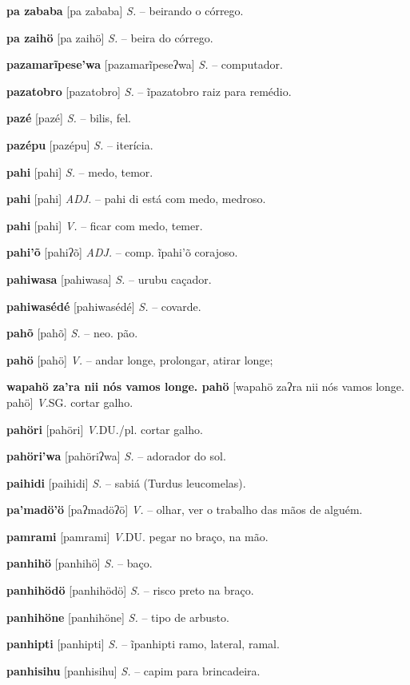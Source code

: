 \textbf{pa zababa} [pa zababa] \textit{S.} -- beirando o córrego.

\textbf{pa zaihö} [pa zaihö] \textit{S.} -- beira do córrego.

\textbf{pazamarĩpese'wa} [pazamarĩpeseʔwa] \textit{S.} -- computador.

\textbf{pazatobro} [pazatobro] \textit{S.} -- ĩpazatobro raiz para remédio.

\textbf{pazé} [pazé] \textit{S.} -- bilis, fel.

\textbf{pazépu} [pazépu] \textit{S.} -- iterícia.

\textbf{pahi} [pahi] \textit{S.} -- medo, temor.

\textbf{pahi} [pahi] \textit{ADJ.} -- pahi di está com medo, medroso.

\textbf{pahi} [pahi] \textit{V.} -- ficar com medo, temer.

\textbf{pahi'õ} [pahiʔõ] \textit{ADJ.} -- comp. ĩpahi'õ corajoso.

\textbf{pahiwasa} [pahiwasa] \textit{S.} -- urubu caçador.

\textbf{pahiwasédé} [pahiwasédé] \textit{S.} -- covarde.

\textbf{pahõ} [pahõ] \textit{S.} -- neo. pão.

\textbf{pahö} [pahö] \textit{V.} -- andar longe, prolongar, atirar longe;

\textbf{wapahö za'ra nii nós vamos longe. pahö} [wapahö zaʔra nii nós vamos longe. pahö] \textit{V.}SG. cortar galho.

\textbf{pahöri} [pahöri] \textit{V.}DU./pl. cortar galho.

\textbf{pahöri'wa} [pahöriʔwa] \textit{S.} -- adorador do sol.

\textbf{paihidi} [paihidi] \textit{S.} -- sabiá (Turdus leucomelas).

\textbf{pa'madö'ö} [paʔmadöʔö] \textit{V.} -- olhar, ver o trabalho das mãos de alguém.

\textbf{pamrami} [pamrami] \textit{V.}DU. pegar no braço, na mão.

\textbf{panhihö} [panhihö] \textit{S.} -- baço.

\textbf{panhihödö} [panhihödö] \textit{S.} -- risco preto na braço.

\textbf{panhihöne} [panhihöne] \textit{S.} -- tipo de arbusto.

\textbf{panhipti} [panhipti] \textit{S.} -- ĩpanhipti ramo, lateral, ramal.

\textbf{panhisihu} [panhisihu] \textit{S.} -- capim para brincadeira.

